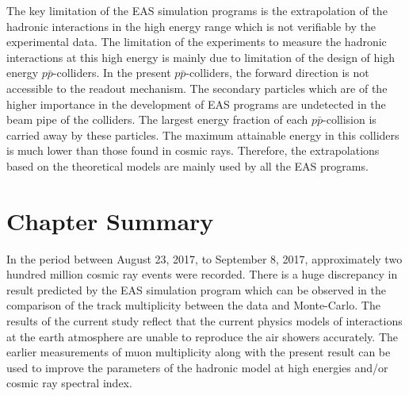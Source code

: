 The key limitation of the EAS simulation programs is the extrapolation
of the hadronic interactions in the high energy range which is not
verifiable by the experimental data. The limitation of the experiments
to measure the hadronic interactions at this high energy is mainly
due to limitation of the design of high energy $p\bar{p}$-colliders.
In the present $p\bar{p}$-colliders, the forward direction is not
accessible to the readout mechanism. The secondary particles
which are of the higher importance in the development of EAS
programs are undetected in the beam pipe of the colliders.
The largest energy fraction of each $p\bar{p}$-collision is
carried away by these particles. The maximum attainable energy
in this colliders is much lower than those found in cosmic rays.
Therefore, the extrapolations based on the theoretical models
are mainly used by all the EAS programs.

\section{Chapter Summary}
In the period between August 23, 2017, to September 8, 2017, approximately two 
hundred million cosmic ray events were recorded. There is a huge discrepancy in 
result predicted by the EAS simulation program which can be observed in the 
comparison of the track multiplicity between the data and Monte-Carlo.
The results of the current study reflect that the current physics models of 
interactions at the earth atmosphere are unable to reproduce the air showers 
accurately. The earlier measurements of muon multiplicity along with the present 
result can be used to improve the parameters of the hadronic model at high 
energies and/or cosmic ray spectral index.
